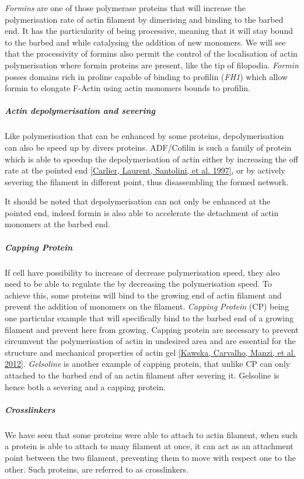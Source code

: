 \documentclass[A4paperpaper,11pt,english]{sphinxmanual}
\begin{document}
\emph{Formins} are one of those polymerase proteins that will increase the
polymerisation rate  of actin filament by dimerising and binding to the barbed
end. It has the particularity of being processive, meaning that it will stay
bound to the barbed and while catalysing the addition of new monomers. We will
see that the processivity of formins also permit the control of the
localisation of actin polymerisation where formin proteins are present, like
the tip of filopodia. \emph{Formin} posses domains rich in proline capable of
binding to profilin (\emph{FH1}) which allow formin to elongate F-Actin using actin
monomers bounds to profilin.


\subparagraph{Actin depolymerisation and severing}
\label{parts/part1:actin-depolymerisation-and-severing}
Like polymerisation that can be enhanced by some proteins, depolymerisation can
also be speed up by divers proteins. ADF/Cofilin is such a family of protein
which is able to speedup the depolymerisation of actin either by increasing the
off rate at the pointed end {\hyperref[bibitem:carlier1997]{{[}Carlier, Laurent, Santolini,  et al.  1997{]}}}, or by actively severing the
filament in different point, thus disassembling the formed network.

It should be noted that depolymerisation can not only be  enhanced at the
pointed end, indeed formin is also able to accelerate the detachment of actin
monomers at the barbed end.


\subparagraph{Capping Protein}
\label{parts/part1:capping-protein}
If cell have possibility to increase of decrease polymerisation speed, they
also need to be able to regulate the by decreasing the polymerisation speed.
To achieve this, some proteins will bind to the growing end of actin filament
and prevent the addition of monomers on the filament. \emph{Capping Protein} (CP)
being one particular example that will specifically bind to the barbed end of a
growing filament and  prevent here from growing. Capping protein are necessary
to prevent circumvent the polymerisation of actin in undesired area and are
essential for the structure and mechanical properties of actin gel
{\hyperref[bibitem:kawska2012]{{[}Kawska, Carvalho, Manzi,  et al.  2012{]}}}. \emph{Gelsoline} is another example of capping protein, that
unlike CP can only attached to the barbed end of an actin filament after
severing it. Gelsoline is hence both a severing and a capping protein.


\subparagraph{Crosslinkers}
\label{parts/part1:crosslinkers}
We have seen that some proteins were able to attach to actin filament, when
such a protein is able to attach to many filament at once, it can act as an
attachment point between the two filament, preventing them to move with respect
one to the other. Such proteins, are referred to as crosslinkers.
\end{document}
